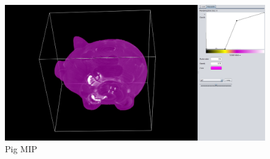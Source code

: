 \documentclass[a4paper,twoside,11pt]{article}
\begin{document}
\newpage

\begin{figure}[h!]
    \includegraphics[width=\textwidth]{SanderImages/PigMIP2.png}
    \caption{Pig MIP}
    \label{fig:PigMIP}
\end{figure}
\end{document}
